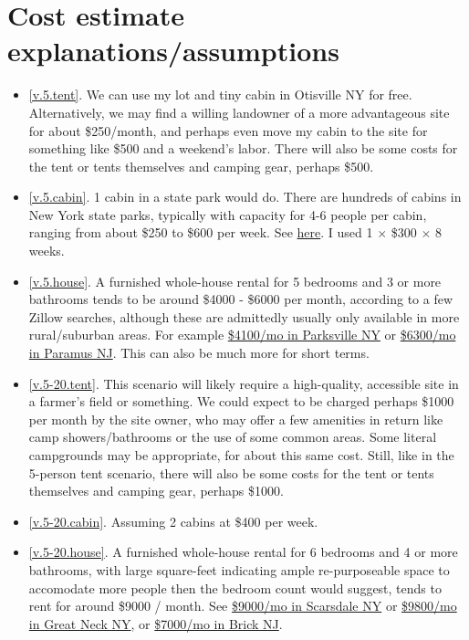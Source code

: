\documentclass[10pt]{article}
\begin{document}
\section*{Cost estimate explanations/assumptions}
\begin{itemize}[leftmargin=*]
\itemsep0em
  \item[]{\ref{v.5.tent}. We can use my lot and tiny cabin in Otisville NY for free. Alternatively, we may find a willing landowner of a more advantageous site for about \$250/month, and perhaps even move my cabin to the site for something like \$500 and a weekend's labor. There will also be some costs for the tent or tents themselves and camping gear, perhaps \$500.}
  \item[]{\ref{v.5.cabin}. 1 cabin in a state park would do. There are hundreds of cabins in New York state parks, typically with capacity for 4-6 people per cabin, ranging from about \$250 to \$600 per week. See \href{https://newyorkstateparks.reserveamerica.com/}{here}. I used 1 $\times$ \$300 $\times$ 8 weeks.}
  \item[]{\ref{v.5.house}. A furnished whole-house rental for 5 bedrooms and 3 or more bathrooms tends to be around \$4000 - \$6000 per month, according to a few Zillow searches, although these are admittedly usually only available in more rural/suburban areas. For example \href{https://www.zillow.com/homedetails/57-Snow-Hill-Rd-Parksville-NY-12768/32773677_zpid/}{\$4100/mo in Parksville NY} or \href{https://www.zillow.com/homedetails/284-Taft-Ct-Paramus-NJ-07652/37992854_zpid/}{\$6300/mo in Paramus NJ}. This can also be much more for short terms.}
  \item[]{\ref{v.5-20.tent}. This scenario will likely require a high-quality, accessible site in a farmer's field or something. We could expect to be charged perhaps \$1000 per month by the site owner, who may offer a few amenities in return like camp showers/bathrooms or the use of some common areas. Some literal campgrounds may be appropriate, for about this same cost. Still, like in the 5-person tent scenario, there will also be some costs for the tent or tents themselves and camping gear, perhaps \$1000.}
  \item[]{\ref{v.5-20.cabin}. Assuming 2 cabins at \$400 per week.}
  \item[]{\ref{v.5-20.house}. A furnished whole-house rental for 6 bedrooms and 4 or more bathrooms, with large square-feet indicating ample re-purposeable space to accomodate more people then the bedroom count would suggest, tends to rent for around \$9000 / month. See \href{https://www.zillow.com/homedetails/3-Forest-Ln-Scarsdale-NY-10583/33095321_zpid/}{\$9000/mo in Scarsdale NY} or \href{https://www.zillow.com/homedetails/75-Meadow-Woods-Rd-Great-Neck-NY-11020/31069513_zpid/}{\$9800/mo in Great Neck NY}, or \href{https://www.zillow.com/homedetails/14-Toledo-Dr-Brick-NJ-08723/39546690_zpid/}{\$7000/mo in Brick NJ}.}

\end{itemize}
\end{document}
